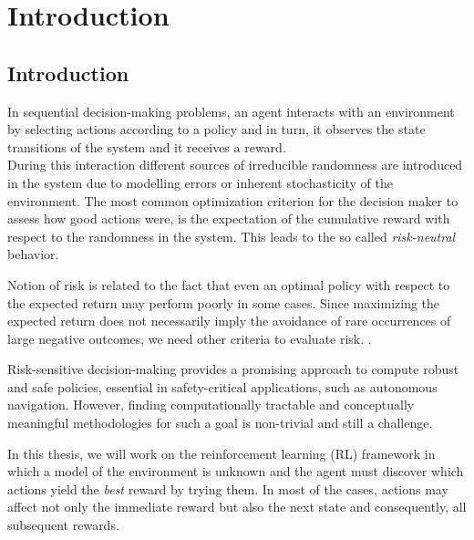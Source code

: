 \chapter{Introduction}
\label{sec:introduction}


\section{Introduction}
In sequential decision-making problems, an agent interacts with an environment by
selecting actions according to a policy 
and in turn, it observes the state transitions of the system and it receives a reward.\\
During this interaction different sources of irreducible 
randomness are introduced in the system due to modelling errors or inherent stochasticity of the environment.
The most common optimization criterion for the decision maker to assess how good actions were, 
is the expectation of the cumulative reward
with respect to the randomness in the system. This leads to the so called \textit{risk-neutral} behavior.

Notion of risk is related to the fact that even an optimal policy with respect to the 
expected return may perform poorly in some cases.
Since maximizing the expected return does not necessarily imply the avoidance
of rare occurrences of large negative outcomes,
we need other criteria to evaluate risk. \citep{Garcia2015}.

Risk-sensitive decision-making provides a promising
approach to compute robust and safe policies, essential in safety-critical applications,
such as autonomous navigation.
However, finding computationally tractable and conceptually meaningful methodologies for
such a goal is non-trivial and still a challenge.

In this thesis, we will work on the reinforcement learning (RL)
framework in which a model of the environment is unknown and the agent
must discover which actions yield the \textit{best} reward by trying them. 
In most of the cases,
actions may affect not only the immediate reward but also the next state and consequently,
all subsequent rewards.

